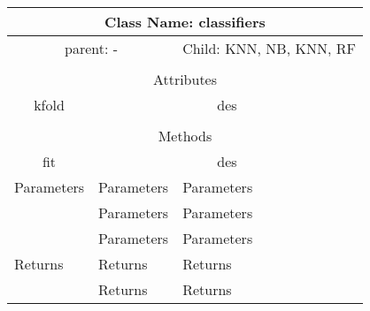 \begin{tabular}{llll}
\toprule
\multicolumn{4}{|c|}{Class Name: classifiers} \\
\midrule
\multicolumn{2}{|c|}{parent: -} &\multicolumn{2}{|c|}{Child: KNN, NB, KNN, RF } \\\bottomrule


\multicolumn{4}{c}{} \\\bottomrule
\multicolumn{4}{|c|}{Attributes} \\\midrule
\multicolumn{1}{|c}{kfold } & \multicolumn{3}{c|}{des } \\\bottomrule



\multicolumn{4}{c}{} \\\bottomrule
\multicolumn{4}{|c|}{Methods} \\\midrule
\multicolumn{1}{|c}{fit } & \multicolumn{3}{c|}{des } \\\midrule


\multicolumn{1}{|c|}{Parameters} & \multicolumn{1}{|l}{Parameters}& \multicolumn{2}{l|}{Parameters}\\
\multicolumn{1}{|l|}{} & \multicolumn{1}{|l}{Parameters}& \multicolumn{2}{l|}{Parameters}\\

\multicolumn{1}{|l|}{} & \multicolumn{1}{|l}{Parameters}& \multicolumn{2}{l|}{Parameters}\\\midrule
\multicolumn{1}{|l|}{Returns} & \multicolumn{1}{|l}{Returns}& \multicolumn{2}{l|}{Returns}\\
\multicolumn{1}{|l|}{} & \multicolumn{1}{|l}{Returns}& \multicolumn{2}{l|}{Returns}\\




\bottomrule
\end{tabular}


